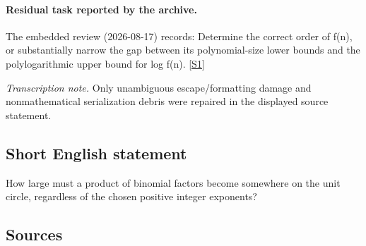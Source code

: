\documentclass[11pt,a4paper]{article}
\newcommand{\sref}[2]{\hyperlink{source:#1:#2}{[S#2]}}
\begin{document}
\paragraph{Residual task reported by the archive.}

The embedded review (2026-08-17) records: Determine the correct order of f(n), or substantially narrow the gap between its polynomial-size lower bounds and the polylogarithmic upper bound for log f(n). \sref{statement}{1}

{\small\emph{Transcription note.} Only unambiguous escape/formatting damage and nonmathematical serialization debris were repaired in the displayed source statement.}

\subsection{Short English statement}

How large must a product of binomial factors become somewhere on the unit circle, regardless of the chosen positive integer exponents?

\subsection{Sources}
\end{document}
